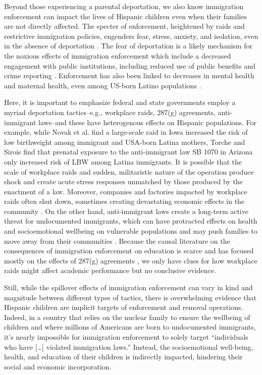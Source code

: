 \documentclass[hidelinks,twoside]{article}
\begin{document}
Beyond those experiencing a parental deportation, we also know immigration enforcement can impact the lives of Hispanic children even when their families are not directly affected. The specter of enforcement, heightened by raids and restrictive immigration policies, engenders fear, stress, anxiety, and isolation, even in the absence of deportation \citep{chaudry_2010_children, lopez_2011_the}. The fear of deportation is a likely mechanism for the noxious effects of immigration enforcement which include a decreased engagement with public institutions, including reduced use of public benefits \citep{alsan_2018_fear,vargas_2015_immigration,vargas_2016_mixedstatus,watson_2014_inside} and crime reporting \citep{jacome_2022_the}. Enforcement has also been linked to decreases in mental health and maternal health, even among US-born Latino populations \citep{novak_2017_change,cardoso_2021_immigration}.

Here, it is important to emphasize federal and state governments employ a myriad deportation tactics–e.g., workplace raids, 287(g) agreements, anti-immigrant laws–and these have heterogenous effects on Hispanic populations. For example, while Novak et al. \citeyearpar{novak_2017_change} find a large-scale raid in Iowa increased the risk of low birthweight among immigrant and USA-born Latina mothers, Torche and Sirois \citeyearpar{torche_2019_restrictive} find that prenatal exposure to the anti-immigrant law SB 1070 in Arizona only increased risk of LBW among Latina immigrants. It is possible that the scale of workplace raids and sudden, militaristic nature of the operation produce shock and create acute stress responses unmatched by those produced by the enactment of a law. Moreover, companies and factories impacted by workplace raids often shut down, sometimes creating devastating economic effects in the community \citep{pedroza_2018_ice}. On the other hand, anti-immigrant laws create a long-term active threat for undocumented immigrants, which can have protracted effects on health and socioemotional wellbeing on vulnerable populations and may push families to move away from their communities \citep{dee_2019_vanished}. Because the causal literature on the consequences of immigration enforcement on education is scarce and has focused mostly on the effects of 287(g) agreements \citep{dee_2019_vanished,bellows_2019_immigration,bellows_2021_the}, we only have clues for how workplace raids might affect academic performance but no conclusive evidence.

Still, while the spillover effects of immigration enforcement can vary in kind and magnitude between different types of tactics, there is overwhelming evidence that Hispanic children are implicit targets of enforcement and removal operations. Indeed, in a country that relies on the nuclear family to ensure the wellbeing of children and where millions of Americans are born to undocumented immigrants, it’s nearly impossible for immigration enforcement to solely target “individuals who have […] violated immigration laws.” Instead, the socioemotional well-being, health, and education of their children is indirectly impacted, hindering their social and economic incorporation. 
\end{document}
